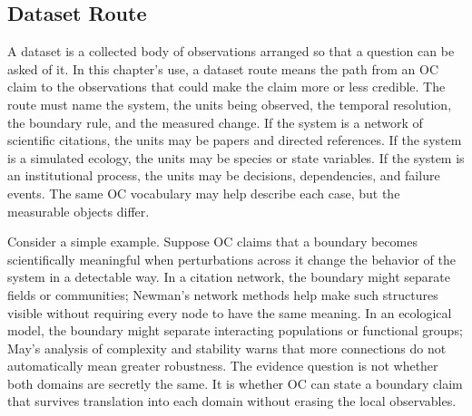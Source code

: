 \documentclass[11pt,a4paper,openany]{book}
\begin{document}
\subsection{Dataset Route}
A dataset is a collected body of observations arranged so that a question can be asked of it. In this chapter's use, a dataset route means the path from an OC claim to the observations that could make the claim more or less credible. The route must name the system, the units being observed, the temporal resolution, the boundary rule, and the measured change. If the system is a network of scientific citations, the units may be papers and directed references. If the system is a simulated ecology, the units may be species or state variables. If the system is an institutional process, the units may be decisions, dependencies, and failure events. The same OC vocabulary may help describe each case, but the measurable objects differ. \cite{bak_soc,newman_networks}\par
Consider a simple example. Suppose OC claims that a boundary becomes scientifically meaningful when perturbations across it change the behavior of the system in a detectable way. In a citation network, the boundary might separate fields or communities; Newman's network methods help make such structures visible without requiring every node to have the same meaning. In an ecological model, the boundary might separate interacting populations or functional groups; May's analysis of complexity and stability warns that more connections do not automatically mean greater robustness. The evidence question is not whether both domains are secretly the same. It is whether OC can state a boundary claim that survives translation into each domain without erasing the local observables.\par
\end{document}
